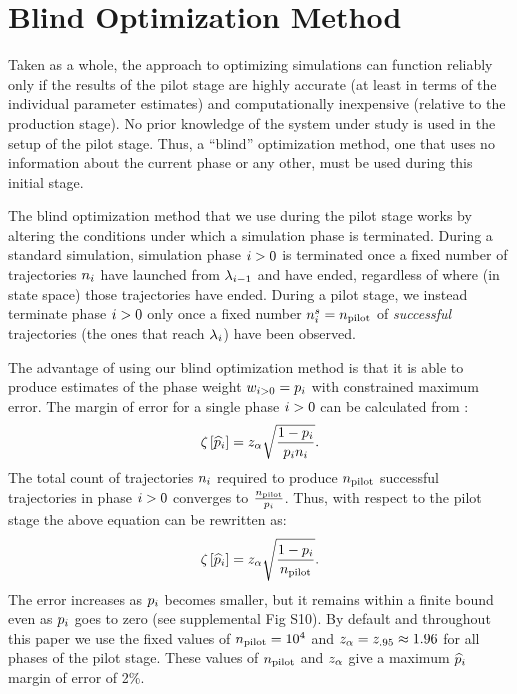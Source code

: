 %
%
%
%

\section{Blind Optimization Method}
\label{sec:blind_opt}
Taken as a whole, the  approach to optimizing simulations can function reliably only if the results of the pilot stage are highly accurate (at least in terms of the individual parameter estimates) and computationally inexpensive (relative to the production stage). No prior knowledge of the system under study is used in the setup of the pilot stage. Thus, a ``blind'' optimization method, one that uses no information about the current phase or any other, must be used during this initial stage.

The blind optimization method that we use during the  pilot stage works by altering the conditions under which a simulation phase is terminated. During a standard  simulation, simulation phase $i>0$ is terminated once a fixed number of trajectories $n_{i}$ have launched from ${\lambda}_{i - 1}$ and have ended, regardless of where (in state space) those trajectories have ended. During a pilot stage, we instead terminate phase $i>0$ only once a fixed number $n_{i}^{s} = n_{\textrm{pilot}}$ of \textit{successful} trajectories (\ie the ones that reach ${\lambda}_{i}$) have been observed.

The advantage of using our blind optimization method is that it is able to produce estimates of the phase weight $w_{i>0} = p_{i}$ with constrained maximum error. The margin of error for a single phase $i>0$ can be calculated from :
    \begin{equation*}
        {\zeta}_{} \left[ \widehat{p}_{i} \right] = z_{\alpha} \sqrt{\frac{1 - p_{i}}{p_{i} n_{i}}}.
    \end{equation*}
The total count of trajectories $n_{i}$ required to produce $n_{\textrm{pilot}}$ successful trajectories in phase $i>0$ converges to $\frac{n_{\textrm{pilot}}}{p_{i}}$. Thus, with respect to the pilot stage the above equation can be rewritten as:
\begin{equation}
    \label{eq:blind_opt_moe}
        {\zeta}_{} \left[ \widehat{p}_{i} \right] = z_{\alpha} \sqrt{\frac{1 - p_{i}}{n_{\textrm{pilot}}}}.
    \end{equation}
The error increases as $p_{i}$ becomes smaller, but it remains within a finite bound even as $p_{i}$ goes to zero (see supplemental Fig S10). By default and throughout this paper we use the fixed values of $n_{\textrm{pilot}} = 10^4$ and $z_{\alpha} = z_{.95} \approx 1.96$ for all phases of the pilot stage. These values of $n_{\textrm{pilot}}$ and $z_{\alpha}$ give a maximum $\widehat{p}_{i}$ margin of error of 2\%.

